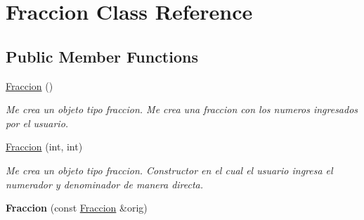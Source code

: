 \hypertarget{class_fraccion}{}\section{Fraccion Class Reference}
\label{class_fraccion}
\subsection*{Public Member Functions}
\begin{DoxyCompactItemize}
\item 
\hyperlink{class_fraccion_a80b8bb475192ceb820428a57e911ceb5}{Fraccion} ()
\begin{DoxyCompactList}\small\item\em Me crea un objeto tipo fraccion. Me crea una fraccion con los numeros ingresados por el usuario. \end{DoxyCompactList}\item 
\hyperlink{class_fraccion_a10be49615b66ea50accb7b433d7dcdfd}{Fraccion} (int, int)
\begin{DoxyCompactList}\small\item\em Me crea un objeto tipo fraccion. Constructor en el cual el usuario ingresa el numerador y denominador de manera directa. \end{DoxyCompactList}\item 
{\bfseries Fraccion} (const \hyperlink{class_fraccion}{Fraccion} \&orig)\hypertarget{class_fraccion_a0d56f72ef83ddbfa15b203d38e533c26}{}\label{class_fraccion_a0d56f72ef83ddbfa15b203d38e533c26}


\end{DoxyCompactItemize}
